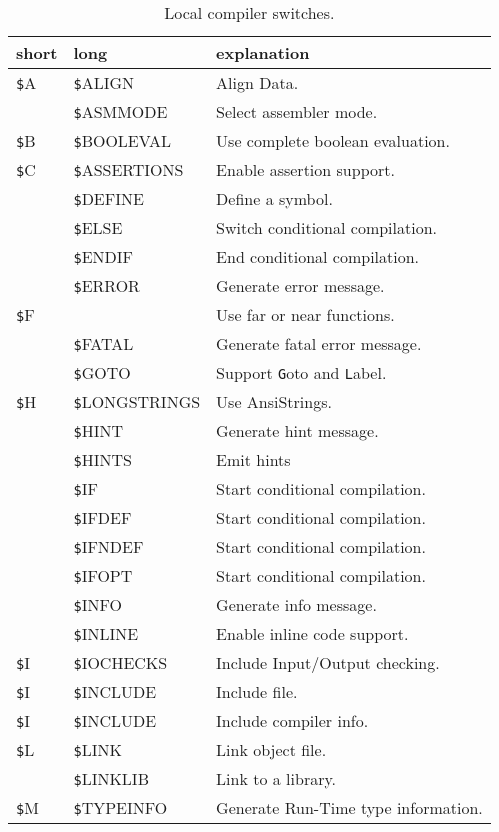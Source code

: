 \documentclass{article}
\newcommand{\var}[1]{{\texttt #1}}
\begin{document}
\begin{table}
\caption[b]{Local compiler switches.}
\begin{tabularx}{\textwidth}{llX}
\textbf {short} & \textbf {long} & \textbf{explanation }\\ \hline
\var{\$A} & \var{\$ALIGN} & Align Data.\\
& \var{\$ASMMODE} & Select assembler mode. \\
\var{\$B} & \var{\$BOOLEVAL} & Use complete boolean evaluation. \\
\var{\$C} & \var{\$ASSERTIONS} & Enable assertion support. \\
& \var{\$DEFINE} & Define a symbol. \\
& \var{\$ELSE} & Switch conditional compilation. \\
& \var{\$ENDIF} & End conditional compilation. \\
& \var{\$ERROR} & Generate error message. \\
\var{\$F} & & Use far or near functions. \\
&  \var{\$FATAL} & Generate fatal error message. \\
& \var{\$GOTO} & Support \var{Goto} and \var{Label}. \\ 
\var{\$H} & \var{\$LONGSTRINGS} & Use AnsiStrings. \\
& \var{\$HINT} & Generate hint message. \\
& \var{\$HINTS} & Emit hints \\
& \var{\$IF} & Start conditional compilation. \\
& \var{\$IFDEF} & Start conditional compilation. \\
& \var{\$IFNDEF} & Start conditional compilation. \\
& \var{\$IFOPT} & Start conditional compilation. \\
& \var{\$INFO} & Generate info message. \\
& \var{\$INLINE} & Enable inline code support. \\
\var{\$I} & \var{\$IOCHECKS} & Include Input/Output checking. \\
\var{\$I} & \var{\$INCLUDE} & Include file.  \\
\var{\$I} & \var{\$INCLUDE} & Include compiler info. \\
\var{\$L} & \var{\$LINK} & Link object file. \\
& \var{\$LINKLIB} & Link to a library. \\
\var{\$M} & \var{\$TYPEINFO} & Generate Run-Time type information. \\

\end{tabularx}
\end{table}
\end{document}
